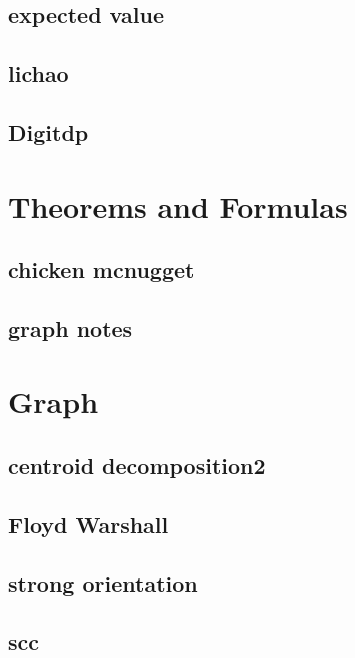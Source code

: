 \subsection{expected value}
\raggedbottom
\hrulefill
\subsection{lichao}
\raggedbottom
\hrulefill
\subsection{Digitdp}
\raggedbottom
\hrulefill

\section{Theorems and Formulas}
\subsection{chicken mcnugget}
\raggedbottom
\hrulefill
\subsection{graph notes}
\raggedbottom
\hrulefill

\section{Graph}
\subsection{centroid decomposition2}
\raggedbottom
\hrulefill
\subsection{Floyd Warshall}
\raggedbottom
\hrulefill
\subsection{strong orientation}
\raggedbottom
\hrulefill
\subsection{scc}
\raggedbottom
\hrulefill
